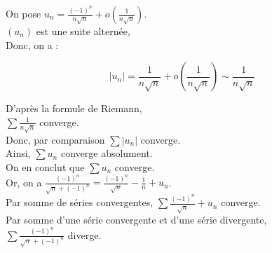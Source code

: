 \begin{enumerate}
    \exobox
    {
        On pose $u_n = \frac{(-1)^n}{n\sqrt{n}} + o(\frac{1}{n\sqrt{n}})$. \\
        $(u_n)$ est une suite alternée, \\
        Donc, on a :

        $$
            | u_n | = \frac{1}{n\sqrt{n}} + o(\frac{1}{n\sqrt{n}}) \sim \frac{1}{n\sqrt{n}}
        $$

        D'après la formule de Riemann, \\
        $\sum \frac{1}{n\sqrt{n}}$ converge. \\
        Donc, par comparaison $\sum |u_n|$ converge. \\
        Ainsi, $\sum u_n$ converge absolument. \\
        On en conclut que $\sum u_n$ converge. \\

        Or, on a $\displaystyle \frac{(-1)^n}{\sqrt{n} + (-1)^n} = \frac{(-1)^n}{\sqrt{n}} - \frac{1}{n} + u_n$. \\

        Par somme de séries convergentes,
        $\displaystyle \sum \frac{(-1)^n}{\sqrt{n}} + u_n$ converge. \\

        Par somme d'une série convergente et d'une série divergente, \\
        $\displaystyle \sum \frac{(-1)^n}{\sqrt{n} + (-1)^n}$ diverge.
    }
\end{enumerate}